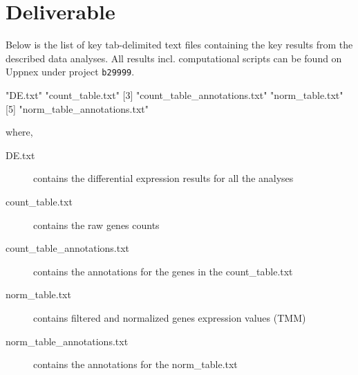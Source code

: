\documentclass[12pt]{article}
\newcommand{\noUppmax}{b29999}
\begin{document}

\section{Deliverable}
Below is the list of key tab-delimited text files containing the key results from the described data analyses. All results incl. computational scripts can be found on Uppnex under project \texttt{{\noUppmax}}. 
\begin{Schunk}
\begin{Soutput}
[1] "DE.txt"                      "count_table.txt"            
[3] "count_table_annotations.txt" "norm_table.txt"             
[5] "norm_table_annotations.txt" 
\end{Soutput}
\end{Schunk}
where, 

\begin{description}
  \item[DE.txt] contains the differential expression results for all the analyses
  \item[count\_table.txt] contains the raw genes counts
  \item[count\_table\_annotations.txt] contains the annotations for the genes in the count\_table.txt
  \item[norm\_table.txt] contains filtered and normalized genes expression values (TMM)
  \item[norm\_table\_annotations.txt] contains the annotations for the norm\_table.txt
\end{description}
\end{document}
